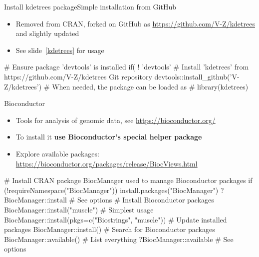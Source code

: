 \documentclass[compress, xelatex, 11pt, xcolor=svgnames, aspectratio=169,
	hyperref={
		bookmarks=true,
		unicode=true,
		colorlinks=true,
		pdftitle={Molecular data in R},
		plainpages=false,
		pdfauthor={Vojtech Zeisek},
		pdfsubject={Course about phylogeny and evolution in R},
		pdfcreator={XeLaTeX},
		pdfkeywords={R, evolution, phylogeny, molecular data},
		linkcolor=Crimson, %
		anchorcolor=Magenta, %
		citecolor=Magenta, %
		filecolor=Magenta, %
		menucolor=Magenta, %
		urlcolor=DodgerBlue, %
		},
	url={hyphens, lowtilde} %
	]{beamer}
\begin{document}
\begin{frame}[fragile]{Install kdetrees package}{Simple installation from GitHub}
	\label{kdetreesinst}
	\begin{itemize}
		\item Removed from CRAN, forked on GitHub as \url{https://github.com/V-Z/kdetrees} and slightly updated
		\item See slide~\ref{kdetrees} for usage
	\end{itemize}
	\begin{spluscode}
    # Ensure package 'devtools' is installed
    if( ! 'devtools' %
    # Install 'kdetrees' from https://github.com/V-Z/kdetrees Git repository
    devtools::install_github('V-Z/kdetrees')
    # When needed, the package can be loaded as
    # library(kdetrees)
	\end{spluscode}
\end{frame}

\begin{frame}[fragile]{Bioconductor}
	\label{bioc}
	\begin{itemize}
		\item Tools for analysis of genomic data, see \url{https://bioconductor.org/}
		\item To install it \textbf{use Bioconductor's special helper package}
		\item Explore available packages: \href{https://bioconductor.org/packages/}{https://bioconductor.org/packages/release/BiocViews.html}
	\end{itemize}
	\begin{spluscode}
    # Install CRAN package BiocManager used to manage Bioconductor packages
    if (!requireNamespace("BiocManager")) install.packages("BiocManager")
    ?BiocManager::install # See options
    # Install Bioconductor packages
    BiocManager::install("muscle") # Simplest usage
    BiocManager::install(pkgs=c("Biostrings", "muscle"))
    # Update installed packages
    BiocManager::install()
    # Search for Bioconductor packages
    BiocManager::available() # List everything
    ?BiocManager::available # See options
	\end{spluscode}
\end{frame}
\end{document}
